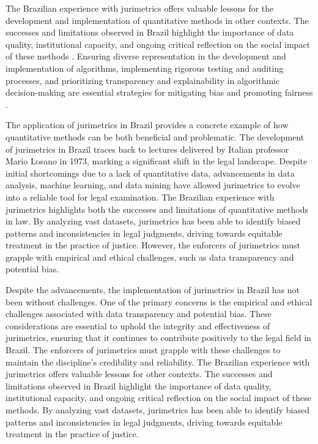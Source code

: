 The Brazilian experience with jurimetrics offers valuable lessons for the development and implementation of quantitative methods in other contexts. The successes and limitations observed in Brazil highlight the importance of data quality, institutional capacity, and ongoing critical reflection on the social impact of these methods \cite{10.5040/9781350220645,10.1080/07329113.2015.1046739}. Ensuring diverse representation in the development and implementation of algorithms, implementing rigorous testing and auditing processes, and prioritizing transparency and explainability in algorithmic decision-making are essential strategies for mitigating bias and promoting fairness \cite{10.5040/9781350220645,10.1080/07329113.2015.1046739}.

The application of jurimetrics in Brazil provides a concrete example of how quantitative methods can be both beneficial and problematic. The development of jurimetrics in Brazil traces back to lectures delivered by Italian professor Mario Losano in 1973, marking a significant shift in the legal landscape. Despite initial shortcomings due to a lack of quantitative data, advancements in data analysis, machine learning, and data mining have allowed jurimetrics to evolve into a reliable tool for legal examination. The Brazilian experience with jurimetrics highlights both the successes and limitations of quantitative methods in law. By analyzing vast datasets, jurimetrics has been able to identify biased patterns and inconsistencies in legal judgments, driving towards equitable treatment in the practice of justice. However, the enforcers of jurimetrics must grapple with empirical and ethical challenges, such as data transparency and potential bias.

Despite the advancements, the implementation of jurimetrics in Brazil has not been without challenges. One of the primary concerns is the empirical and ethical challenges associated with data transparency and potential bias. These considerations are essential to uphold the integrity and effectiveness of jurimetrics, ensuring that it continues to contribute positively to the legal field in Brazil. The enforcers of jurimetrics must grapple with these challenges to maintain the discipline's credibility and reliability. The Brazilian experience with jurimetrics offers valuable lessons for other contexts. The successes and limitations observed in Brazil highlight the importance of data quality, institutional capacity, and ongoing critical reflection on the social impact of these methods. By analyzing vast datasets, jurimetrics has been able to identify biased patterns and inconsistencies in legal judgments, driving towards equitable treatment in the practice of justice.

